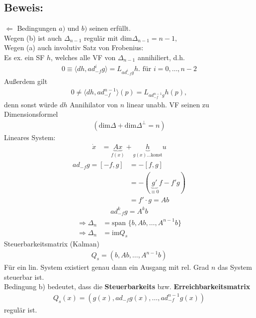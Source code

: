 \documentclass[ngerman]{tudscrreprt}
\begin{document}
\subsection*{Beweis:} $\Leftarrow$ Bedingungen $a) $ und $b) $ seinen erfüllt. \\ 
Wegen (b) ist auch $\Delta_{n-1}$ regulär mit dim$ \Delta_{n-1} = n-1, $\\ 
Wegen (a) auch involutiv Satz von Frobenius: \\ 
Es ex. ein SF $h$, welches alle VF von $\Delta_{n-1} $ annihiliert, d.h. \begin{align*}
0 \equiv \langle dh, ad_{-f}^i g \rangle = L_{ad_{-f}^i g} h. \text{ für } i = 0,\dots, n-2 \tag{*}
\end{align*}
Außerdem gilt \begin{align*}
0 \ne \langle dh, ad_{-f}^{n-1} \rangle (p) = L_{ad_{-f}^{n-1} g}h(p),  \tag{**}
\end{align*}denn sonst würde $dh$ Annihilator von $n$ linear unabh. VF seinen zu Dimensionsformel \begin{align*}(\text{dim} \Delta + \text{dim} \Delta^{\perp} = n)\end{align*}
Lineares System: 
\begin{align*}
\dot x &= \underbrace{Ax}_{f(x)} + \underbrace{h}_{g(x) \dots \text{konst}} u
\end{align*}
\begin{align*}
ad_{-f}g = [-f,g] &= -[f,g]\\ 
&= -(\underbrace{g'}_{\equiv 0}f - f'g)\\ 
&= f'\cdot g = Ab
\end{align*}
\begin{align*}
ad_{-f}^k g = A^k b
\end{align*}
\begin{align*}
\Rightarrow \Delta_n &= \text{span }\{ b, Ab, \dots, A^{n-1}b\}\\ 
\Rightarrow \Delta_n &=\text{im} Q_s
\end{align*}Steuerbarkeitsmatrix (Kalman) \begin{align*}
Q_s = (b, Ab, \dots, A^{n-1}b)
\end{align*}Für ein lin. System existiert genau dann ein Ausgang mit rel. Grad $n$ das System steuerbar ist.\\ 
Bedingung b) bedeutet, dass die \textbf{Steuerbarkeits} bzw. \textbf{Erreichbarkeitsmatrix} \begin{align*}
Q_s(x) = (g(x), ad_{-f}g(x), \dots, ad_{-f}^{n-1} g(x) )
\end{align*}regulär ist. 
\end{document}
